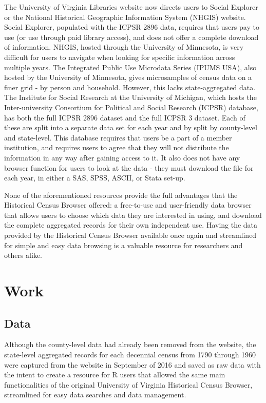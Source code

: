 \documentclass[11pt,]{article}
\begin{document}
The University of Virginia Libraries website now directs users to Social
Explorer or the National Historical Geographic Information System
(NHGIS) website. Social Explorer, populated with the ICPSR 2896 data,
requires that users pay to use (or use through paid library access), and
does not offer a complete download of information. NHGIS, hosted through
the University of Minnesota, is very difficult for users to navigate
when looking for specific information across multiple years. The
Integrated Public Use Microdata Series (IPUMS USA), also hosted by the
University of Minnesota, gives microsamples of census data on a finer
grid - by person and household. However, this lacks state-aggregated
data. The Institute for Social Research at the University of Michigan,
which hosts the Inter-university Consortium for Political and Social
Research (ICPSR) database, has both the full ICPSR 2896 dataset and the
full ICPSR 3 dataset. Each of these are split into a separate data set
for each year and by split by county-level and state-level. This
database requires that users be a part of a member institution, and
requires users to agree that they will not distribute the information in
any way after gaining access to it. It also does not have any browser
function for users to look at the data - they must download the file for
each year, in either a SAS, SPSS, ASCII, or Stata set-up.

None of the aforementioned resources provide the full advantages that
the Historical Census Browser offered: a free-to-use and user-friendly
data browser that allows users to choose which data they are interested
in using, and download the complete aggregated records for their own
independent use. Having the data provided by the Historical Census
Browser available once again and streamlined for simple and easy data
browsing is a valuable resource for researchers and others alike.

\section{Work}

\subsection{Data}

Although the county-level data had already been removed from the
website, the state-level aggregated records for each decennial census
from 1790 through 1960 were captured from the website in September of
2016 and saved as raw data with the intent to create a resource for R
users that allowed the same main functionalities of the original
University of Virginia Historical Census Browser, streamlined for easy
data searches and data management.
\end{document}
